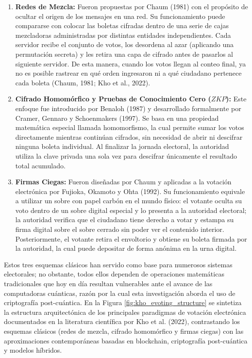 \begin{enumerate}
	\item \textbf{Redes de Mezcla:} Fueron propuestas por Chaum (1981) con el propósito de ocultar el origen de los mensajes en una red. Su funcionamiento puede compararse con colocar las boletas cifradas dentro de una serie de cajas mezcladoras administradas por distintas entidades independientes. Cada servidor recibe el conjunto de votos, los desordena al azar (aplicando una permutación secreta) y les retira una capa de cifrado antes de pasarlos al siguiente servidor. De esta manera, cuando los votos llegan al conteo final, ya no es posible rastrear en qué orden ingresaron ni a qué ciudadano pertenece cada boleta (Chaum, 1981; Kho et al., 2022).

	\item \textbf{Cifrado Homomórfico y Pruebas de Conocimiento Cero ($ZKP$):} Este enfoque fue introducido por Benaloh (1987) y desarrollado formalmente por Cramer, Gennaro y Schoenmakers (1997). Se basa en una propiedad matemática especial llamada homomorfismo, la cual permite sumar los votos directamente mientras continúan cifrados, sin necesidad de abrir ni descifrar ninguna boleta individual. Al finalizar la jornada electoral, la autoridad utiliza la clave privada una sola vez para descifrar únicamente el resultado total acumulado.

	\item \textbf{Firmas Ciegas:} Fueron diseñadas por Chaum y aplicadas a la votación electrónica por Fujioka, Okamoto y Ohta (1992). Su funcionamiento equivale a utilizar un sobre con papel carbón en el mundo físico: el votante oculta su voto dentro de un sobre digital especial y lo presenta a la autoridad electoral; la autoridad verifica que el ciudadano tiene derecho a votar y estampa su firma digital sobre el sobre cerrado sin poder ver el contenido interior. Posteriormente, el votante retira el envoltorio y obtiene su boleta firmada por la autoridad, la cual puede depositar de forma anónima en la urna digital.
\end{enumerate}

Estos tres esquemas clásicos han servido como base para numerosos sistemas electorales; no obstante, todos ellos dependen de operaciones matemáticas tradicionales que hoy en día resultan vulnerables ante el avance de las computadoras cuánticas, razón por la cual esta investigación aborda el uso de criptografía post-cuántica. En la Figura \ref{fig:kho_evoting_structure} se sintetiza la estructura arquitectónica de los principales paradigmas de votación electrónica documentados en la literatura científica por Kho et al. (2022), contrastando los esquemas clásicos (redes de mezcla, cifrado homomórfico y firmas ciegas) con las aproximaciones contemporáneas basadas en blockchain, criptografía post-cuántica y modelos híbridos.

